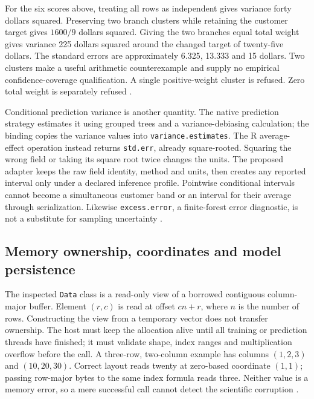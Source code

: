 For the six scores above, treating all rows as independent gives
variance forty dollars squared. Preserving two branch clusters while
retaining the customer target gives \(1600/9\) dollars squared. Giving
the two branches equal total weight gives variance 225 dollars squared
around the changed target of twenty-five dollars. The standard errors
are approximately 6.325, 13.333 and 15 dollars. Two clusters make a
useful arithmetic counterexample and supply no empirical
confidence-coverage qualification. A single positive-weight cluster is
refused. Zero total weight is separately refused
\citep{exec13_grf_oracle,exec13_grf_rpath}.

Conditional prediction variance is another quantity. The native
prediction strategy estimates it using grouped trees and a
variance-debiasing calculation; the binding copies the variance values
into \texttt{variance.estimates}. The R average-effect operation instead
returns \texttt{std.err}, already square-rooted. Squaring the wrong
field or taking its square root twice changes the units. The proposed
adapter keeps the raw field identity, method and units, then creates any
reported interval only under a declared inference profile. Pointwise
conditional intervals cannot become a simultaneous customer band or an
interval for their average through serialization. Likewise
\texttt{excess.error}, a finite-forest error diagnostic, is not a
substitute for sampling uncertainty
\citep{exec13_grf_native,exec13_grf_rpath}.

\subsection{Memory ownership, coordinates and model persistence}

The inspected \texttt{Data} class is a read-only view of a borrowed
contiguous column-major buffer. Element \((r,c)\) is read at offset
\(cn+r\), where \(n\) is the number of rows. Constructing the view from
a temporary vector does not transfer ownership. The host must keep the
allocation alive until all training or prediction threads have finished;
it must validate shape, index ranges and multiplication overflow before
the call. A three-row, two-column example has columns \((1,2,3)\) and
\((10,20,30)\). Correct layout reads twenty at zero-based coordinate
\((1,1)\); passing row-major bytes to the same index formula reads
three. Neither value is a memory error, so a mere successful call cannot
detect the scientific corruption
\citep{exec13_grf_memory,exec13_grf_oracle}.

